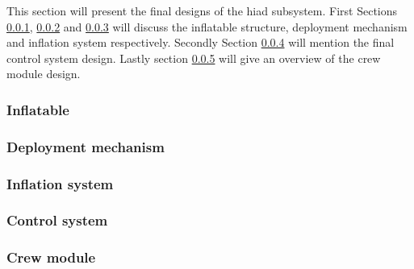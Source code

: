 %
This section will present the final designs of the \gls{hiad} subsystem. First Sections \ref{subsec:infldes}, \ref{subsec:depldes} and \ref{subsec:inflsys} will discuss the inflatable structure, deployment mechanism and inflation system respectively. Secondly Section \ref{subsec:controlsys} will mention the final control system design. Lastly section \ref{subsec:crewmod} will give an overview of the crew module design.
\subsubsection{Inflatable}\label{subsec:infldes}


%

\subsubsection{Deployment mechanism}\label{subsec:depldes}


\subsubsection{Inflation system}\label{subsec:inflsys}


\subsubsection{Control system}\label{subsec:controlsys}


\subsubsection{Crew module}\label{subsec:crewmod}


